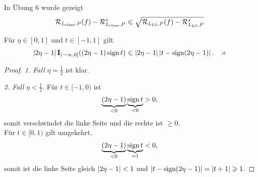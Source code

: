 In Übung 6 wurde gezeigt
\begin{align*}
\mathcal{R}_{L_{\mathrm{class}},P}(f) - \mathcal{R}_{L_{\mathrm{class}},P}^* \leqslant 
\sqrt{\mathcal{R}_{L_\mathrm{LS},P}(f)-\mathcal{R}_{L_\mathrm{LS},P}^*}
\end{align*}

\begin{lem}
\label{prop:2.2.7}
Für $\eta\in[0,1]$ und $t\in[-1,1]$ gilt
\begin{align*}
\abs{2\eta-1}\Id_{(-\infty,0]}((2\eta-1)\sign t)\le
\abs{2\eta-1}\abs{t-\sign(2\eta-1)}.\fishhere
\end{align*}
\end{lem}
\begin{proof}
\textit{1. Fall} $\eta =\frac{1}{2}$ ist klar.

\textit{2. Fall} $\eta < \frac{1}{2}$.
Für $t\in[-1,0)$ ist
\begin{align*}
\underbrace{(2\eta-1)}_{<0}\underbrace{\operatorname{sign} t}_{<0} > 0,
\end{align*}
somit verschwindet die linke Seite und die rechte ist $\ge 0$.\\
Für $t\in [0,1)$ gilt umgekehrt,
\begin{align*}
\underbrace{(2\eta-1)}_{<0}\underbrace{\operatorname{sign} t}_{=1} < 0,
\end{align*}
somit ist die linke Seite gleich $\left|2\eta-1\right|< 1$ und $\left|t-\operatorname{sign}(2\eta-1)\right|
= \left|t+1\right| \geqslant 1$.\qedhere
\end{proof}

